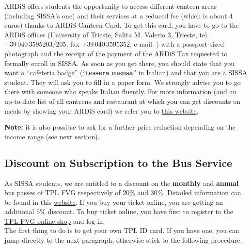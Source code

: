 \documentclass{sissavademecum}
\begin{document}
ARDiS offers students the opportunity to access different canteen areas (including SISSA's one) and their services at a reduced fee (which is about 4 euros) thanks to ARDiS Canteen Card. To get this card, you have to  go to the ARDiS offices (University of Trieste, Salita M. Valerio 3, Trieste, tel. $+39 \, 040 \, 3595203/205$, fax $+39 \, 040 \, 3595352$, e-mail: ) with a passport-sized photograph and the receipt of the payment of the ARDiS Tax requested to formally enroll in SISSA. As soon as you get there, you should state that you want a ``cafeteria badge'' (``\textbf{tessera mensa}'' in Italian) and that you are a SISSA student. They will ask you to fill in a paper form. We strongly advise you to go there with someone who speaks Italian fluently. For more information (and an  up-to-date list of all canteens and restaurant at which you can get discounts on meals by showing your ARDiS card) we refer you to \href{http://www.ardiss.fvg.it/contenuti.php?view=page&id=214#scheda532}{this website}. 

\textbf{Note:} it is also possible to ask for a further price reduction depending on the income range (see next section).


\subsection{Discount on Subscription to the Bus Service}

As SISSA students, we are entitled to a discount on the \textbf{monthly} and \textbf{annual} bus passes of TPL FVG respectively of $20\%$ and $30\%$. Detailed information can be found in this \href{http://www.ardiss.fvg.it/contenuti.php?view=page&id=215}{website}. If you buy your ticket online, you are getting an additional $5$\% discount. To buy ticket online, you have first to register to the \href{https://tplfvg.it/it/le-tariffe/acquisto-web/}{TPL FVG online shop} and log in. \\

The first thing to do is to get your own TPL ID card. If you have one, you can jump directly to the next paragraph; otherwise stick to the following procedure.
\end{document}
